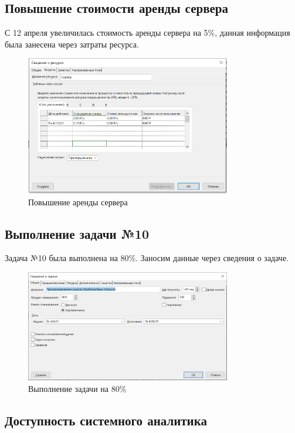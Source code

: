 \subsection{Повышение стоимости аренды сервера}

С 12 апреля увеличилась стоимость аренды сервера на 5\%, данная информация была занесена через затраты ресурса.

\begin{figure}[H]
    \centering
    \includegraphics[width=0.8\textwidth]{img/content/3.png}
    \caption{Повышение аренды сервера}
    \label{fig:3}
\end{figure}

\subsection{Выполнение задачи №10}

Задача №10 была выполнена на 80\%. Заносим данные через сведения о задаче.

\begin{figure}[H]
    \centering
    \includegraphics[width=0.8\textwidth]{img/content/4.png}
    \caption{Выполнение задачи на 80\%}
    \label{fig:4}
\end{figure}

\subsection{Доступность системного аналитика}

